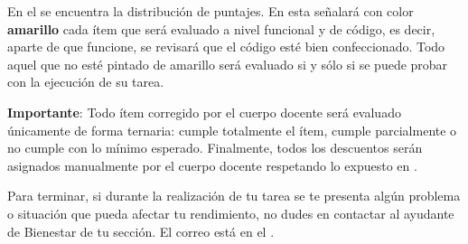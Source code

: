 \label{sec:importante}


En el  se encuentra la distribución de puntajes. En esta señalará con color \textbf{amarillo} cada ítem que será evaluado a nivel funcional y de código, es decir, aparte de que funcione, se revisará que el código esté bien confeccionado. Todo aquel que no esté pintado de amarillo será evaluado si y sólo si se puede probar con la ejecución de su tarea.

\textbf{Importante}: Todo ítem corregido por el cuerpo docente será evaluado únicamente de forma ternaria: cumple totalmente el ítem, cumple parcialmente o no cumple con lo mínimo esperado. Finalmente, todos los descuentos serán asignados manualmente por el cuerpo docente respetando lo expuesto en .

Para terminar, si durante la realización de tu tarea se te presenta algún problema o situación que pueda afectar tu rendimiento, no dudes en contactar al ayudante de Bienestar de tu sección. El correo está en el  .
